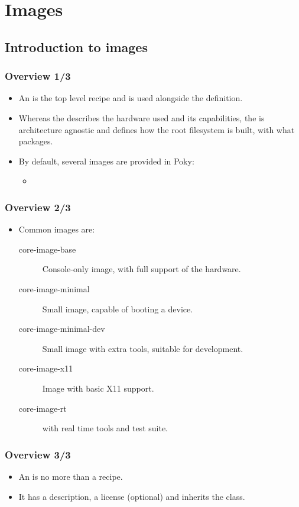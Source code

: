 \section{Images}
\subsection{Introduction to images}

\begin{frame}
  \frametitle{Overview 1/3}
  \begin{itemize}
    \item An  is the top level recipe and is used
      alongside the  definition.
    \item Whereas the  describes the hardware used and
      its capabilities, the  is architecture agnostic and
      defines how the root filesystem is built, with what packages.
    \item By default, several images are provided in Poky:
      \begin{itemize}
        \item {}
      \end{itemize}
  \end{itemize}
\end{frame}

\begin{frame}
  \frametitle{Overview 2/3}
  \begin{itemize}
    \item Common images are:
      \begin{description}
        \item[core-image-base] Console-only image, with full support
          of the hardware.
        \item[core-image-minimal] Small image, capable of booting a
          device.
        \item[core-image-minimal-dev] Small image with extra tools,
          suitable for development.
        \item[core-image-x11] Image with basic X11 support.
        \item[core-image-rt]  with real time
          tools and test suite.
      \end{description}
  \end{itemize}
\end{frame}

\begin{frame}
  \frametitle{Overview 3/3}
  \begin{itemize}
    \item An  is no more than a recipe.
    \item It has a description, a license (optional) and inherits the
       class.
  \end{itemize}
\end{frame}

